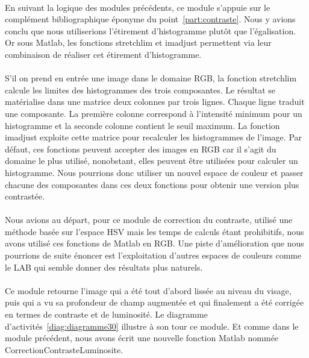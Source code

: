 \documentclass[11pt, french]{report-rd-info}
\begin{document}
\paragraph*{}
En suivant la logique des modules précédents, ce module s'appuie sur le complément bibliographique éponyme du point~\ref{part:contraste}. Nous y avions conclu que nous utiliserions l'étirement d'histogramme plutôt que l'égalisation. Or sous Matlab, les fonctions stretchlim et imadjust permettent via leur combinaison de réaliser cet étirement d'histogramme.

\paragraph*{}
S'il on prend en entrée une image dans le domaine RGB, la fonction stretchlim calcule les limites des histogrammes des trois composantes. Le résultat se matérialise dans une matrice deux colonnes par trois lignes. Chaque ligne traduit une composante. La première colonne correspond à l'intensité minimum pour un histogramme et la seconde colonne contient le seuil maximum. La fonction imadjust exploite cette matrice pour recalculer les histogrammes de l'image. Par défaut, ces fonctions peuvent accepter des images en RGB car il s'agit du domaine le plus utilisé, nonobstant, elles peuvent être utilisées pour calculer un histogramme. Nous pourrions donc utiliser un nouvel espace de couleur et passer chacune des composantes dans ces deux fonctions pour obtenir une version plus contrastée. 

\paragraph*{}
Nous avions au départ, pour ce module de correction du contraste, utilisé une méthode basée sur l'espace HSV mais les temps de calculs étant prohibitifs, nous avons utilisé ces fonctions de Matlab en RGB. Une piste d'amélioration que nous pourrions de suite énoncer est l'exploitation d'autres espaces de couleurs comme le LAB qui semble donner des résultats plus naturels. 

\paragraph*{}
Ce module retourne l'image qui a été tout d'abord lissée au niveau du visage, puis qui a vu sa profondeur de champ augmentée et qui finalement a été corrigée en termes de contraste et de luminosité. Le diagramme d'activités~\ref{diag:diagramme30} illustre à son tour ce module. Et comme dans le module précédent, nous avons écrit une nouvelle fonction Matlab nommée CorrectionContrasteLuminosite.
\end{document}

